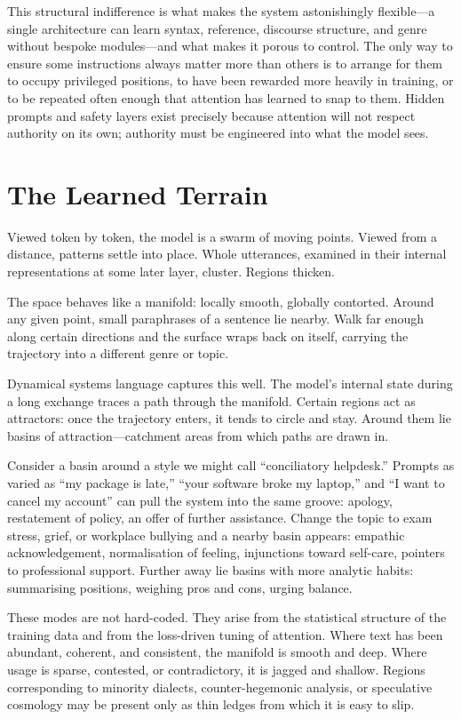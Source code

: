 \documentclass[12pt,a4paper]{article}
\begin{document}
This structural indifference is what makes the system astonishingly flexible---a single architecture can learn syntax, reference, discourse structure, and genre without bespoke modules---and what makes it porous to control. The only way to ensure some instructions always matter more than others is to arrange for them to occupy privileged positions, to have been rewarded more heavily in training, or to be repeated often enough that attention has learned to snap to them. Hidden prompts and safety layers exist precisely because attention will not respect authority on its own; authority must be engineered into what the model sees.

\section{The Learned Terrain}

Viewed token by token, the model is a swarm of moving points. Viewed from a distance, patterns settle into place. Whole utterances, examined in their internal representations at some later layer, cluster. Regions thicken.

The space behaves like a manifold: locally smooth, globally contorted. Around any given point, small paraphrases of a sentence lie nearby. Walk far enough along certain directions and the surface wraps back on itself, carrying the trajectory into a different genre or topic.

Dynamical systems language captures this well. The model's internal state during a long exchange traces a path through the manifold. Certain regions act as attractors: once the trajectory enters, it tends to circle and stay. Around them lie basins of attraction---catchment areas from which paths are drawn in.

Consider a basin around a style we might call ``conciliatory helpdesk.'' Prompts as varied as ``my package is late,'' ``your software broke my laptop,'' and ``I want to cancel my account'' can pull the system into the same groove: apology, restatement of policy, an offer of further assistance. Change the topic to exam stress, grief, or workplace bullying and a nearby basin appears: empathic acknowledgement, normalisation of feeling, injunctions toward self-care, pointers to professional support. Further away lie basins with more analytic habits: summarising positions, weighing pros and cons, urging balance.

These modes are not hard-coded. They arise from the statistical structure of the training data and from the loss-driven tuning of attention. Where text has been abundant, coherent, and consistent, the manifold is smooth and deep. Where usage is sparse, contested, or contradictory, it is jagged and shallow. Regions corresponding to minority dialects, counter-hegemonic analysis, or speculative cosmology may be present only as thin ledges from which it is easy to slip.
\end{document}
